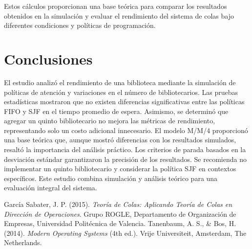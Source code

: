\documentclass[10pt,twocolumn]{article}
\begin{document}
Estos cálculos proporcionan una base teórica para comparar los resultados obtenidos en la simulación y evaluar el rendimiento del sistema de colas bajo diferentes condiciones y políticas de programación.

\section{Conclusiones}

El estudio analizó el rendimiento de una biblioteca mediante la simulación de políticas de atención y variaciones en el número de bibliotecarios. Las pruebas estadísticas mostraron que no existen diferencias significativas entre las políticas FIFO y SJF en el tiempo promedio de espera. Asimismo, se determinó que agregar un quinto bibliotecario no mejora las métricas de rendimiento, representando solo un costo adicional innecesario. El modelo M/M/4 proporcionó una base teórica que, aunque mostró diferencias con los resultados simulados, resaltó la importancia del análisis práctico. Los criterios de parada basados en la desviación estándar garantizaron la precisión de los resultados. Se recomienda no implementar un quinto bibliotecario y considerar la política SJF en contextos específicos. Este estudio combina simulación y análisis teórico para una evaluación integral del sistema.


\begin{thebibliography}{9}
	
	García Sabater, J. P. (2015). \textit{Teoría de Colas: Aplicando Teoría de Colas en Dirección de Operaciones}. Grupo ROGLE, Departamento de Organización de Empresas, Universidad Politécnica de Valencia.
	Tanenbaum, A. S., \& Bos, H. (2014). \textit{Modern Operating Systems} (4th ed.). Vrije Universiteit, Amsterdam, The Netherlands.
	
	
\end{thebibliography}
\end{document}
